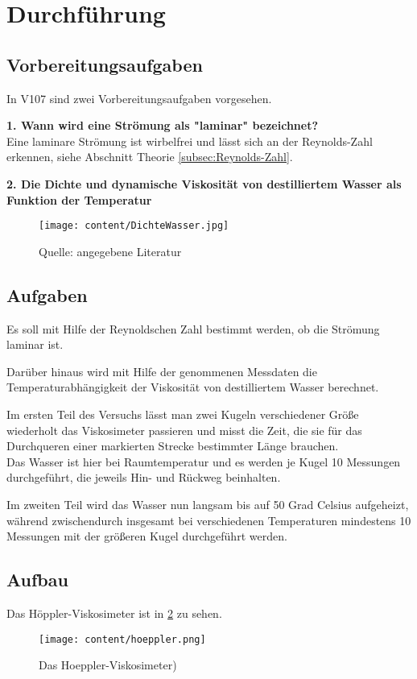 \section{Durchführung}
\label{sec:Durchführung}

\subsection{Vorbereitungsaufgaben}

In V107 sind zwei Vorbereitungsaufgaben vorgesehen.

\textbf{1. Wann wird eine Strömung als "laminar" bezeichnet?} \\
Eine laminare Strömung ist wirbelfrei und lässt sich an der Reynolds-Zahl erkennen, siehe Abschnitt 
Theorie \ref{subsec:Reynolds-Zahl}.



\textbf{2. Die Dichte und dynamische Viskosität von destilliertem Wasser als Funktion der Temperatur}\\
\begin{figure}
    
    \centering
    \texttt{[image: content/DichteWasser.jpg]}
    \caption{Quelle: angegebene Literatur}
    \label{fig:DichteWasser}
\end{figure}




\subsection{Aufgaben}
\label{subsec:Aufgaben}

Es soll mit Hilfe der Reynoldschen Zahl bestimmt werden, ob die Strömung laminar ist.

Darüber hinaus wird mit Hilfe der genommenen Messdaten die Temperaturabhängigkeit der Viskosität von
destilliertem Wasser berechnet. 

Im ersten Teil des Versuchs lässt man zwei Kugeln verschiedener Größe wiederholt das Viskosimeter 
passieren und misst die Zeit, die sie für das Durchqueren einer markierten Strecke bestimmter Länge brauchen. \\
Das Wasser ist hier bei Raumtemperatur und es werden je Kugel 10 Messungen durchgeführt, die jeweils Hin- und Rückweg 
beinhalten.

Im zweiten Teil wird das Wasser nun langsam bis auf 50 Grad Celsius aufgeheizt, während zwischendurch 
insgesamt bei verschiedenen Temperaturen mindestens 10 Messungen mit der größeren Kugel durchgeführt werden. 




\subsection{Aufbau}
\label{subsec:Aufbau}

Das Höppler-Viskosimeter ist in \ref{fig:aufbau} zu sehen.

\begin{figure}
    
    \centering
    \texttt{[image: content/hoeppler.png]}
    \caption{Das Hoeppler-Viskosimeter)}
    \label{fig:aufbau}
\end{figure}